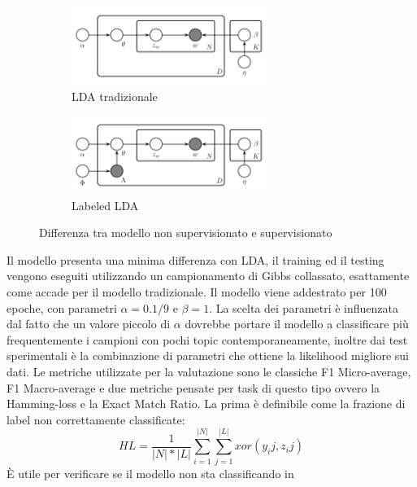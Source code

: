 \documentclass[technote]{IEEEtran}
\begin{document}
\begin{figure}[H]
\vspace{-5mm}
  \begin{subfigure}[b]{0.45\textwidth}
  \centering
    \includegraphics[width=0.7\textwidth]{images/lda}
    \caption{LDA tradizionale}
  \end{subfigure}
   \hfill
  \begin{subfigure}[b]{0.45\textwidth}
  \centering
    \includegraphics[width=0.7\textwidth]{images/llda}
    \caption{Labeled LDA}
  \end{subfigure}
  \caption{Differenza tra modello non supervisionato e supervisionato}
  \label{fig_llda}
\end{figure}
Il modello presenta una minima differenza con LDA, il training ed il testing vengono eseguiti utilizzando un campionamento di Gibbs collassato, esattamente come accade per il modello tradizionale. Il modello viene addestrato per 100 epoche, con parametri $ \alpha = 0.1 / 9 $ e $ \beta = 1 $. La scelta dei parametri è influenzata dal fatto che un valore piccolo di $ \alpha $ dovrebbe portare il modello a classificare più frequentemente i campioni con pochi topic contemporaneamente, inoltre dai test sperimentali è la combinazione di parametri che ottiene la likelihood migliore sui dati.
Le metriche utilizzate per la valutazione sono le classiche F1 Micro-average, F1 Macro-average e due metriche pensate per task di questo tipo ovvero la Hamming-loss \cite{6772729} e la Exact Match Ratio. La prima è definibile come la frazione di label non correttamente classificate:
\begin{equation}
HL=\frac{1}{|N|*|L|}\sum_{i=1}^{|N|}\sum_{j=1}^{|L|}xor(y_ij, z_ij)
\end{equation}
\` E utile per verificare se il modello non sta classificando in
\end{document}
